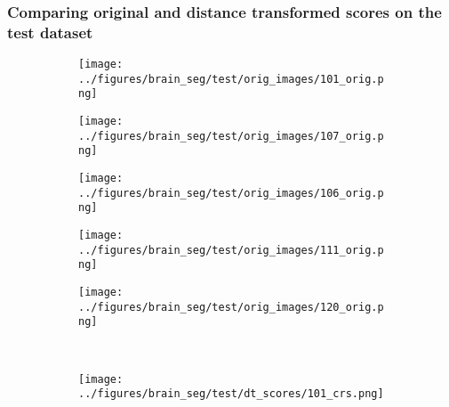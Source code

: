 \subsubsection{Comparing original and distance transformed scores on the test dataset}\label{braintest}
	\begin{figure}[h!] %
	\centering
		\begin{subfigure}[b]{0.03\textwidth} %
		\centering
	\end{subfigure}
	\hspace{0.1cm}
	\begin{subfigure}{0.16\textwidth}
		\centering
		\texttt{[image: ../figures/brain\_seg/test/orig\_images/101\_orig.png]}
		\label{fig:1}
	\end{subfigure}
	\begin{subfigure}{0.16\textwidth}
		\centering
		\texttt{[image: ../figures/brain\_seg/test/orig\_images/107\_orig.png]}
		\label{fig:2}
	\end{subfigure}
	\begin{subfigure}{0.16\textwidth}
		\centering
		\texttt{[image: ../figures/brain\_seg/test/orig\_images/106\_orig.png]}
		\label{fig:3}
	\end{subfigure}
	\begin{subfigure}{0.16\textwidth}
		\centering
		\texttt{[image: ../figures/brain\_seg/test/orig\_images/111\_orig.png]}
		\label{fig:4}
	\end{subfigure}
			\begin{subfigure}{0.16\textwidth}
					\centering
					\texttt{[image: ../figures/brain\_seg/test/orig\_images/120\_orig.png]}
					\label{fig:5}
				\end{subfigure}
		\\
	\vspace{-0.35cm}
	\begin{subfigure}[b]{0.03\textwidth} %
		\centering
	\end{subfigure}
	\hspace{0.1cm}
	\begin{subfigure}{0.16\textwidth}
		\centering
		\texttt{[image: ../figures/brain\_seg/test/dt\_scores/101\_crs.png]}

\end{subfigure}
\end{figure}
